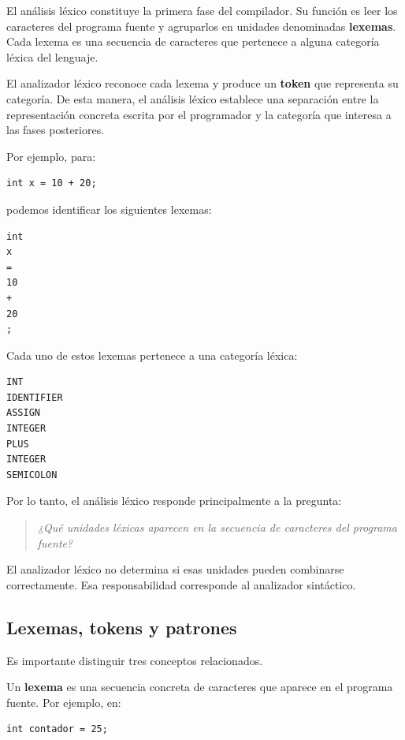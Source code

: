 \documentclass[11pt,a4paper]{article}
\begin{document}
El análisis léxico constituye la primera fase del compilador. Su función es
leer los caracteres del programa fuente y agruparlos en unidades denominadas
\textbf{lexemas}. Cada lexema es una secuencia de caracteres que pertenece a
alguna categoría léxica del lenguaje.

El analizador léxico reconoce cada lexema y produce un \textbf{token} que
representa su categoría. De esta manera, el análisis léxico establece una
separación entre la representación concreta escrita por el programador y la
categoría que interesa a las fases posteriores.

Por ejemplo, para:

\begin{lstlisting}
int x = 10 + 20;
\end{lstlisting}

podemos identificar los siguientes lexemas:

\begin{lstlisting}
int
x
=
10
+
20
;
\end{lstlisting}

Cada uno de estos lexemas pertenece a una categoría léxica:

\begin{lstlisting}
INT
IDENTIFIER
ASSIGN
INTEGER
PLUS
INTEGER
SEMICOLON
\end{lstlisting}

Por lo tanto, el análisis léxico responde principalmente a la pregunta:

\begin{quote}
\textit{¿Qué unidades léxicas aparecen en la secuencia de caracteres del
programa fuente?}
\end{quote}

El analizador léxico no determina si esas unidades pueden combinarse
correctamente. Esa responsabilidad corresponde al analizador sintáctico.

\subsection{Lexemas, tokens y patrones}

Es importante distinguir tres conceptos relacionados.

Un \textbf{lexema} es una secuencia concreta de caracteres que aparece en el
programa fuente. Por ejemplo, en:

\begin{lstlisting}
int contador = 25;
\end{lstlisting}
\end{document}
